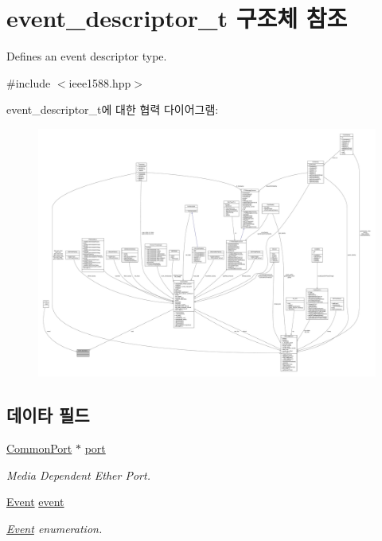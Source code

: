 \hypertarget{structevent__descriptor__t}{}\section{event\+\_\+descriptor\+\_\+t 구조체 참조}
\label{structevent__descriptor__t}


Defines an event descriptor type.  




{\ttfamily \#include $<$ieee1588.\+hpp$>$}



event\+\_\+descriptor\+\_\+t에 대한 협력 다이어그램\+:
\nopagebreak
\begin{figure}[H]
\begin{center}
\leavevmode
\includegraphics[width=350pt]{structevent__descriptor__t__coll__graph}
\end{center}
\end{figure}
\subsection*{데이타 필드}
\begin{DoxyCompactItemize}
\item 
\hyperlink{class_common_port}{Common\+Port} $\ast$ \hyperlink{structevent__descriptor__t_aa621204f6a0407aae7cf9885124c883a}{port}
\begin{DoxyCompactList}\small\item\em Media Dependent Ether Port. \end{DoxyCompactList}\item 
\hyperlink{class_event}{Event} \hyperlink{structevent__descriptor__t_acf61400dc69c74e927a476661f47141d}{event}
\begin{DoxyCompactList}\small\item\em \hyperlink{class_event}{Event} enumeration. \end{DoxyCompactList}\end{DoxyCompactItemize}


